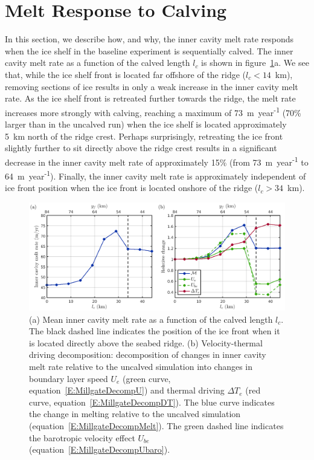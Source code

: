 \documentclass[draft]{agujournal2019}
\begin{document}
\section{Melt Response to Calving}\label{S:Results:lc}
In this section, we describe how, and why, the inner cavity melt rate responds when the ice shelf in the baseline experiment is sequentially calved. The inner cavity melt rate as a function of the calved length $l_c$ is shown in figure~\ref{fig:figure4}a. We see that, while the ice shelf front is located far offshore of the ridge ($l_c< 14$~km), removing sections of ice results in only a weak increase in the inner cavity melt rate. As the ice shelf front is retreated further towards the ridge, the melt rate increases more strongly with calving, reaching a maximum of 73~m~year\textsuperscript{-1} (70\% larger than in the uncalved run) when the ice shelf is located approximately 5~km north of the ridge crest. Perhaps surprisingly, retreating the ice front slightly further to sit directly above the ridge crest results in a significant decrease in the inner cavity melt rate of approximately 15\% (from 73~m~year\textsuperscript{-1} to 64~m~year\textsuperscript{-1}). Finally, the inner cavity melt rate is approximately independent of ice front position when the ice front is located onshore of the ridge ($l_c>34$~km).

\begin{figure}
    \centering
    \includegraphics[width = \textwidth]{../make_figures/plots/figure4.png}
    \caption{(a) Mean inner cavity melt rate as a function of the calved length $l_c$. The black dashed line indicates the position of the ice front when it is located directly above the seabed ridge. (b) Velocity-thermal driving decomposition: decomposition of changes in inner cavity melt rate relative to the uncalved simulation into changes in boundary layer speed $U_e$ (green curve, equation~\eqref{E:MillgateDecompU}) and thermal driving $\Delta T_e$ (red curve, equation~\eqref{E:MillgateDecompDT}). The blue curve indicates the change in melting relative to the uncalved simulation (equation~\eqref{E:MillgateDecompMelt}). The green dashed line indicates the barotropic velocity effect $U_{be}$ (equation~\eqref{E:MillgateDecompUbaro}).  }
    \label{fig:figure4}
\end{figure}
\end{document}
